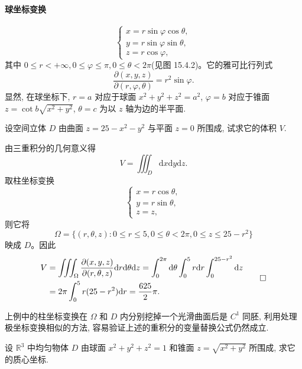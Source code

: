 \paragraph*{球坐标变换}

\[
  \begin{cases}
    x=r\sin\varphi\cos\theta,\\
    y=r\sin\varphi\sin\theta,\\
    z=r\cos\varphi,
  \end{cases}
\]
其中 $0\leqslant r<+\infty,0\leqslant\varphi\leqslant\pi,0\leqslant\theta<2\pi$(见图 15.4.2)。它的雅可比行列式
\[
  \frac{\partial(x,y,z)}{\partial(r,\varphi,\theta)}=r^2\sin\varphi.
\]
显然, 在球坐标下, $r=a$ 对应于球面 $x^2+y^2+z^2=a^2$, $\varphi=b$ 对应于锥面 $z=\cot b\sqrt{x^2+y^2}$, $\theta=c$ 为以 $z$ 轴为边的半平面.

\begin{example}\label{example:ma-15-4-6}
设空间立体 $D$ 由曲面 $z=25-x^2-y^2$ 与平面 $z=0$ 所围成, 试求它的体积 $V$.
\end{example}


\begin{solve}
由三重积分的几何意义得
\[
  V=\iiint_D\mathrm dx\mathrm dy\mathrm dz.
\]
取柱坐标变换
\[
  \begin{cases}
    x=r\cos\theta,\\
    y=r\sin\theta,\\
    z=z,
  \end{cases}
\]
则它将
\[
  \Omega=\{(r,\theta,z):0\leqslant r\leqslant5,0\leqslant\theta<2\pi,0\leqslant z\leqslant25-r^2\}
\]
映成 $D$。因此
\[
\begin{aligned}
  V&=\iiint_\Omega\frac{\partial(x,y,z)}{\partial(r,\theta,z)}
  \mathrm dr\mathrm d\theta\mathrm dz
  =\int_0^{2\pi}\mathrm d\theta\int_0^5 r\mathrm dr\int_0^{25-r^2}\mathrm dz\\
  &=2\pi\int_0^5 r(25-r^2)\mathrm dr=\frac{625}2\pi.
\end{aligned}
\qedhere
\]
\end{solve}


\begin{remark}\label{remark:ma-15-source-62}
上例中的柱坐标变换在 $\Omega$ 和 $D$ 内分别挖掉一个光滑曲面后是 $C^1$ 同胚, 利用处理极坐标变换相似的方法, 容易验证上述的重积分的变量替换公式仍然成立.
\end{remark}


\begin{example}\label{example:ma-15-4-7}
设 $\mathbb R^3$ 中均匀物体 $D$ 由球面 $x^2+y^2+z^2=1$ 和锥面 $z=\sqrt{x^2+y^2}$ 所围成, 求它的质心坐标.
\end{example}



